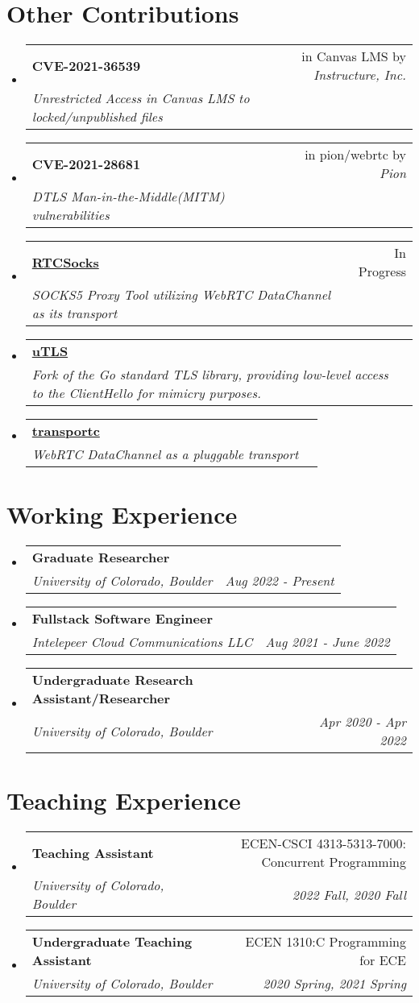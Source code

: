 \documentclass[letterpaper,11pt]{article}
\makeatletter
\newcommand{\resumeSubheading}[4]{
  \vspace{-2pt}\item
    \begin{tabular*}{0.97\textwidth}[t]{l@{\extracolsep{\fill}}r}
      \textbf{#1} & #2 \\
      \textit{\small#3} & \textit{\small #4} \\
    \end{tabular*}\vspace{-7pt}
}
\newcommand{\resumeSubHeadingListStart}{\begin{itemize}[leftmargin=0.15in, label={}]}
\newcommand{\resumeSubHeadingListEnd}{\end{itemize}}
\makeatother
\begin{document}
\section{Other Contributions}
\resumeSubHeadingListStart
\resumeSubheading
{\textbf{CVE-2021-36539}}{in Canvas LMS by \emph{Instructure, Inc.}}
{Unrestricted Access in Canvas LMS to locked/unpublished files}{}
\resumeSubheading
{\textbf{CVE-2021-28681}}{in pion/webrtc by \emph{Pion}}
{DTLS Man-in-the-Middle(MITM) vulnerabilities}{}
\resumeSubheading
{\href{https://github.com/Gaukas/rtcsocks}{\textbf{RTCSocks}}}{In Progress}
{SOCKS5 Proxy Tool utilizing WebRTC DataChannel as its transport}{}
\resumeSubheading
{\href{https://github.com/refraction-networking/utls}{\textbf{uTLS}}}{}
{Fork of the Go standard TLS library, providing low-level access to the ClientHello for mimicry purposes.}{}
\resumeSubheading
{\href{https://github.com/Gaukas/transportc}{\textbf{transportc}}}{}
{WebRTC DataChannel as a pluggable transport}{}
\resumeSubHeadingListEnd
\vspace{1pt}

\section{Working Experience}
\resumeSubHeadingListStart
\resumeSubheading
{Graduate Researcher}{}
{University of Colorado, Boulder}{Aug 2022 - Present}
\resumeSubheading
{Fullstack Software Engineer}{}
{Intelepeer Cloud Communications LLC}{Aug 2021 - June 2022}
\resumeSubheading
{Undergraduate Research Assistant/Researcher}{}
{University of Colorado, Boulder}{Apr 2020 - Apr 2022}
\resumeSubHeadingListEnd
\vspace{1pt}

\section{Teaching Experience}
\resumeSubHeadingListStart
\resumeSubheading
{Teaching Assistant}{ECEN-CSCI 4313-5313-7000: Concurrent Programming}
{University of Colorado, Boulder}{2022 Fall, 2020 Fall}
\resumeSubheading
{Undergraduate Teaching Assistant}{ECEN 1310:C Programming for ECE}
{University of Colorado, Boulder}{2020 Spring, 2021 Spring}
\resumeSubHeadingListEnd
\vspace{1pt}
\end{document}
